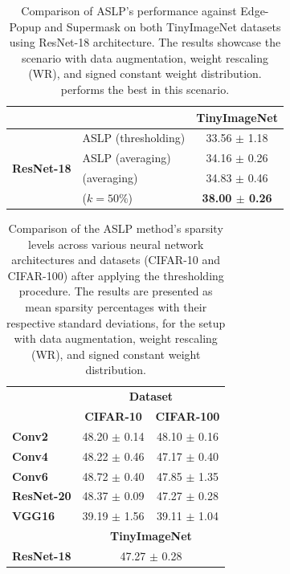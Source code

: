 \begin{table}[htbp]
  \centering
  \begin{tabular}{llc}
    \cmidrule[\heavyrulewidth]{3-3}
     &  & \textbf{TinyImageNet} \\
    \toprule
   \multirow{4}{*}{\textbf{ResNet-18}} & ASLP  (thresholding) & 33.56 $\pm$ 1.18 \\
    & ASLP (averaging) & 34.16 $\pm$ 0.26 \\
    & \cite{DBLP:conf/nips/ZhouLLY19} (averaging)  & 34.83 $\pm$ 0.46 \\
    & \cite{DBLP:conf/cvpr/RamanujanWKFR20} ($k=50\%$) &  \textbf{38.00 $\pm$ 0.26} \\
    \bottomrule
    \end{tabular}
    
  \caption{Comparison of ASLP's performance against Edge-Popup and Supermask
  \cite{DBLP:conf/cvpr/RamanujanWKFR20,DBLP:conf/nips/ZhouLLY19} on both
  TinyImageNet datasets using ResNet-18 architecture. The
  results showcase the scenario with data augmentation, weight rescaling (WR),
  and signed constant weight distribution. \cite{DBLP:conf/cvpr/RamanujanWKFR20}
  performs the best in this scenario.}
  \label{tab:chap2:tinyimagenet_performances_comparison}
\end{table}

\begin{table}[htbp]
  \centering\begin{tabular}{lcc}
    \cmidrule[\heavyrulewidth]{2-3}
     & \multicolumn{2}{c}{\textbf{Dataset}} \\
     & \textbf{CIFAR-10} & \textbf{CIFAR-100} \\
    \toprule
    \textbf{Conv2} & 48.20 $\pm$ 0.14 & 48.10 $\pm$ 0.16 \\
    \textbf{Conv4} & 48.22 $\pm$ 0.46 & 47.17 $\pm$ 0.40 \\
    \textbf{Conv6} & 48.72 $\pm$ 0.40 & 47.85 $\pm$ 1.35 \\
    \textbf{ResNet-20} & 48.37 $\pm$ 0.09 & 47.27 $\pm$ 0.28 \\
    \textbf{VGG16} & 39.19 $\pm$ 1.56 & 39.11 $\pm$ 1.04 \\
    \midrule
     & \multicolumn{2}{c}{\textbf{TinyImageNet}} \\
     \textbf{ResNet-18} & \multicolumn{2}{c}{47.27 $\pm$ 0.28} \\
    \bottomrule
    \end{tabular}
  \caption{Comparison of the ASLP method's sparsity levels across 
  various neural network architectures and datasets (CIFAR-10 and CIFAR-100) 
  after applying the thresholding procedure. The results are presented 
  as mean sparsity percentages with their respective standard deviations, for
  the setup with data augmentation, weight rescaling (WR), and signed constant
  weight distribution.}
  \label{<label>}
\end{table}

